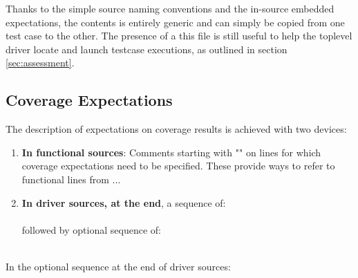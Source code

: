 \documentclass {report}
\begin{document}
Thanks to the simple source naming conventions and the in-source embedded
expectations, the  contents is entirely generic and can simply be
copied from one test case to the other.
%
The presence of a this file is still useful to help the toplevel driver locate
and launch testcase executions, as outlined in section \ref{sec:assessment}.

\subsection{Coverage Expectations}

The description of expectations on coverage results is achieved with two
devices:

\begin{enumerate}
\item \textbf{In functional sources}:
  Comments starting with "\T{-{}- \#}" on lines for which coverage
  expectations need to be specified. These provide ways to refer
  to functional lines from ...

\item \textbf{In driver sources, at the end}, a sequence of:\\

  \\

  followed by optional sequence of:\\

  \\
\end{enumerate}

In the optional sequence at the end of driver sources:
\end{document}
